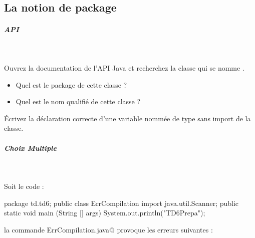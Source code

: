\documentclass[11pt,a4paper]{article}
\begin{document}
            \par
        \subsection{La notion de package}
			
		\subparagraph{API} 
		
                \textcolor{white}{.} \par
            
								Ouvrez la documentation de l'API Java 
								et recherchez la classe qui se nomme
								\verb@IllegalFormatException@.
							
            \par
        
					\begin{itemize}
				
			\item 
									Quel est le package de cette classe ?   
									 \textcolor{gray}{\underline{\hspace*{10em}}} 
			\item 
									Quel est le nom qualifi\'e de cette classe ?\par
				 \textcolor{gray}{\underline{\hspace*{20em}}} 
					\end{itemize}
				
								\'Ecrivez la d\'eclaration correcte d'une variable nomm\'ee
								\verb@clavier@ de type 
								\verb@Scanner@ sans import de la classe.
							
            \par
         \textcolor{gray}{\underline{\hspace*{16em}}}  \textcolor{gray}{\underline{\hspace*{5em}}} 
            \par
        
			
		\subparagraph{Choix Multiple } 
		
                \textcolor{white}{.} \par
            Soit le code :
            \par
        \begin{Java}
package td.td6; 
public class ErrCompilation {
    import java.util.Scanner;
    public static void main (String [] args) { 
        System.out.println("TD6Prepa");
    }
}							\end{Java}
								la commande \verb@javac ErrCompilation.java@ 
								provoque les erreurs suivantes :
							
\end{document}
